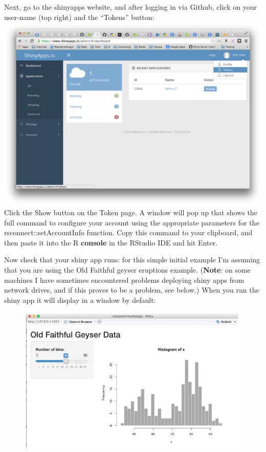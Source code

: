 \documentclass[]{article}
\begin{document}
Next, go to the shinyapps website, and after logging in via Github,
click on your user-name (top right) and the ``Tokens'' button:
\includegraphics{figs/tokens.png} Click the Show button on the Token
page. A window will pop up that shows the full command to configure your
account using the appropriate parameters for the
rsconnect::setAccountInfo function. Copy this command to your clipboard,
and then paste it into the R \textbf{console} in the RStudio IDE and hit
Enter.

Now check that your shiny app runs: for this simple initial example I'm
assuming that you are using the Old Faithful geyser eruptions example.
(\textbf{Note}: on some machines I have sometimes encountered problems
deploying shiny apps from network drives, and if this proves to be a
problem, see below.) When you run the shiny app it will display in a
window by default:

\begin{figure}
\centering
\includegraphics{figs/Old_Faithful.PNG}
\caption{}
\end{figure}
\end{document}
